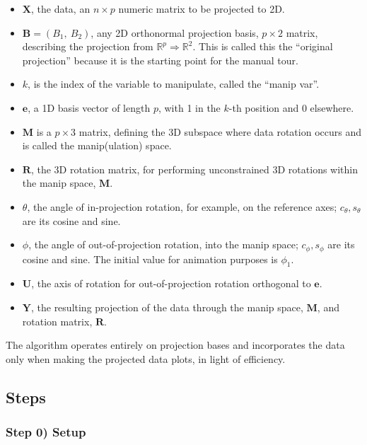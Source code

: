 \documentclass{monashthesis}
\begin{document}
\begin{itemize}
\item
  \(\textbf{X}\), the data, an \(n \times p\) numeric matrix to be projected to 2D.
\item
  \(\textbf{B} = (B_1,~ B_2)\), any 2D orthonormal projection basis, \(p \times 2\) matrix, describing the projection from \(\mathbb{R}^p \Rightarrow \mathbb{R}^2\). This is called this the ``original projection'' because it is the starting point for the manual tour.
\item
  \(k\), is the index of the variable to manipulate, called the ``manip var''.
\item
  \(\textbf{e}\), a 1D basis vector of length \(p\), with 1 in the \(k\)-th position and 0 elsewhere.
\item
  \(\textbf{M}\) is a \(p \times 3\) matrix, defining the 3D subspace where data rotation occurs and is called the manip(ulation) space.
\item
  \(\textbf{R}\), the 3D rotation matrix, for performing unconstrained 3D rotations within the manip space, \(\textbf{M}\).
\item
  \(\theta\), the angle of in-projection rotation, for example, on the reference axes; \(c_\theta, s_\theta\) are its cosine and sine.
\item
  \(\phi\), the angle of out-of-projection rotation, into the manip space; \(c_\phi, s_\phi\) are its cosine and sine. The initial value for animation purposes is \(\phi_1\).
\item
  \(\textbf{U}\), the axis of rotation for out-of-projection rotation orthogonal to \(\textbf{e}\).
\item
  \(\textbf{Y}\), the resulting projection of the data through the manip space, \(\textbf{M}\), and rotation matrix, \(\textbf{R}\).
\end{itemize}

The algorithm operates entirely on projection bases and incorporates the data only when making the projected data plots, in light of efficiency.

\hypertarget{steps}{%
\subsection{Steps}\label{steps}}

\hypertarget{step-0-setup}{%
\subsubsection{Step 0) Setup}\label{step-0-setup}}
\end{document}
